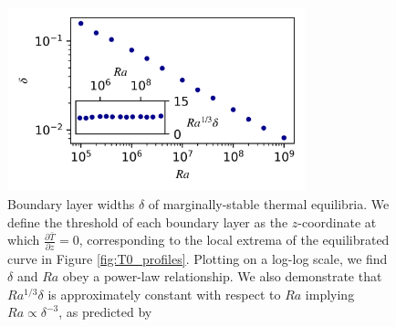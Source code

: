 \documentclass[reprint,amsmath,amssymb,aps]{revtex4-1}
\begin{document}
\begin{figure}[h]
    \centering
    \includegraphics[width=3.4in]{del_ra.PNG}
    \caption{Boundary layer widths $\delta$ of marginally-stable thermal equilibria. We define the threshold of each boundary layer as the $z$-coordinate at which $\frac{\partial \bar{T}}{\partial z} = 0$, corresponding to the local extrema of the equilibrated curve in Figure \ref{fig:T0_profiles}. Plotting on a log-log scale, we find $\delta$ and $Ra$ obey a power-law relationship. We also demonstrate that $Ra^{1/3}\delta$ is approximately constant with respect to $Ra$ implying $Ra \propto  \delta^{-3}$, as predicted by \cite{Malkus}}
    \label{fig:bl_ra}
\end{figure}
\end{document}
